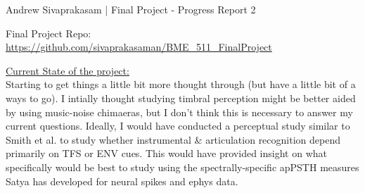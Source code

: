 \documentclass[9pt]{extarticle}
\begin{document}
{\huge Andrew Sivaprakasam | Final Project - Progress Report 2}
\begin{center}
Final Project Repo: \url{https://github.com/sivaprakasaman/BME_511_FinalProject} \\
\end{center} 

\underline{Current State of the project:}\\ 
%
%
%

Starting to get things a little bit more thought through (but have a little bit of a ways to go). I intially thought studying timbral perception might be better aided by using music-noise chimaeras, but I don't think this is necessary to answer my current questions. Ideally, I would have conducted a perceptual study similar to Smith et al. to study whether instrumental \& articulation recognition depend primarily on TFS or ENV cues. This would have provided insight on what specifically would be best to study using the spectrally-specific apPSTH measures Satya has developed for neural spikes and ephys data.  \\
\end{document}
